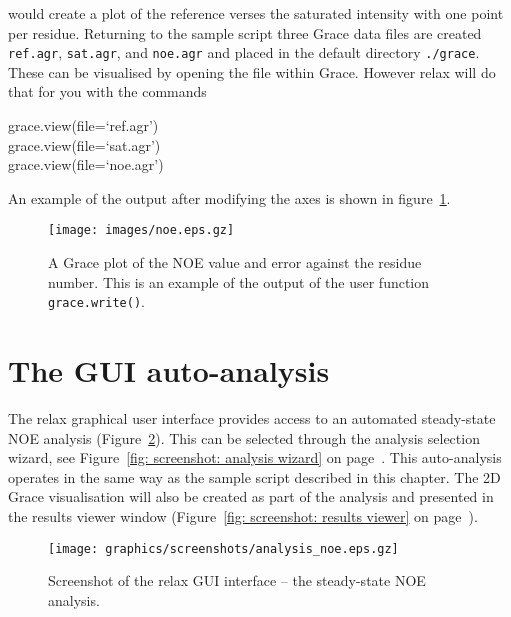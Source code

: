 
would create a plot of the reference verses the saturated intensity with one point per residue.  Returning to the sample script three Grace data files are created \texttt{ref.agr}, \texttt{sat.agr}, and \texttt{noe.agr} and placed in the default directory \texttt{./grace}.  These can be visualised by opening the file within Grace.  However relax will do that for you with the commands

\begin{exampleenv}
grace.view(file=`ref.agr') \\
grace.view(file=`sat.agr') \\
grace.view(file=`noe.agr')
\end{exampleenv}

An example of the output after modifying the axes is shown in figure~\ref{fig: NOE plot}.

\begin{figure}
\centerline{\texttt{[image: images/noe.eps.gz]}}
\caption[NOE plot]{A Grace plot of the NOE value and error against the residue number.  This is an example of the output of the user function \texttt{grace.write()}.}\label{fig: NOE plot}
\end{figure}




\section{The GUI auto-analysis}

The relax graphical user interface provides access to an automated steady-state NOE analysis (Figure~\ref{fig: screenshot: NOE analysis}).  This can be selected through the analysis selection wizard, see Figure~\ref{fig: screenshot: analysis wizard} on page~\pageref{fig: screenshot: analysis wizard}.  This auto-analysis operates in the same way as the sample script described in this chapter.  The 2D Grace visualisation will also be created as part of the analysis and presented in the results viewer window (Figure~\ref{fig: screenshot: results viewer} on page~\pageref{fig: screenshot: results viewer}).

\begin{figure}
\centerline{\texttt{[image: graphics/screenshots/analysis\_noe.eps.gz]}}
\caption[GUI screenshot -- NOE analysis]{Screenshot of the relax GUI interface -- the steady-state NOE analysis.}\label{fig: screenshot: NOE analysis}
\end{figure}
